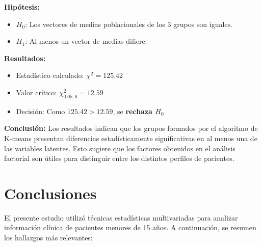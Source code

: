 \documentclass[12pt]{report}
\begin{document}
\textbf{Hipótesis:}
\begin{itemize}
    \item $H_0$: Los vectores de medias poblacionales de los 3 grupos son iguales.
    \item $H_1$: Al menos un vector de medias difiere.
\end{itemize}

\textbf{Resultados:}
\begin{itemize}
    \item Estadístico calculado: $\chi^2 = 125.42$
    \item Valor crítico: $\chi^2_{0.05, 6} = 12.59$
    \item Decisión: Como $125.42 > 12.59$, se \textbf{rechaza $H_0$}
\end{itemize}

\textbf{Conclusión:} Los resultados indican que los grupos formados por el algoritmo de K-means presentan diferencias estadísticamente significativas en al menos una de las variables latentes. Esto sugiere que los factores obtenidos en el análisis factorial son útiles para distinguir entre los distintos perfiles de pacientes.


\newpage
\section{Conclusiones}

El presente estudio utilizó técnicas estadísticas multivariadas para analizar información clínica de pacientes menores de 15 años. A continuación, se resumen los hallazgos más relevantes:
\end{document}
